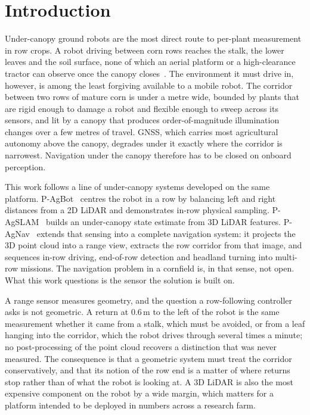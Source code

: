 \documentclass[conference]{IEEEtran}
\begin{document}
\section{Introduction}
Under-canopy ground robots are the most direct route to per-plant measurement in
row crops. A robot driving between corn rows reaches the stalk, the lower leaves
and the soil surface, none of which an aerial platform or a high-clearance
tractor can observe once the canopy closes~\cite{kim2022pagbot}. The environment
it must drive in, however, is among the least forgiving available to a mobile
robot. The corridor between two rows of mature corn is under a metre wide,
bounded by plants that are rigid enough to damage a robot and flexible enough to
sweep across its sensors, and lit by a canopy that produces order-of-magnitude
illumination changes over a few metres of travel. GNSS, which carries most
agricultural autonomy above the canopy, degrades under it exactly where the
corridor is narrowest. Navigation under the canopy therefore has to be closed on
onboard perception.

This work follows a line of under-canopy systems developed on the same platform.
P-AgBot~\cite{kim2022pagbot} centres the robot in a row by balancing left and
right distances from a 2D LiDAR and demonstrates in-row physical sampling.
P-AgSLAM~\cite{kim2024pagslam} builds an under-canopy state estimate from
3D LiDAR features. P-AgNav~\cite{kim2025pagnav} extends that sensing into a
complete navigation system: it projects the 3D point cloud into a range view,
extracts the row corridor from that image, and sequences in-row driving,
end-of-row detection and headland turning into multi-row missions. The
navigation problem in a cornfield is, in that sense, not open. What this work
questions is the sensor the solution is built on.

A range sensor measures geometry, and the question a row-following controller
asks is not geometric. A return at 0.6\,m to the left of the robot is the same
measurement whether it came from a stalk, which must be avoided, or from a leaf
hanging into the corridor, which the robot drives through several times a
minute; no post-processing of the point cloud recovers a distinction that was
never measured. The consequence is that a geometric system must treat the
corridor conservatively, and that its notion of the row end is a matter of
where returns stop rather than of what the robot is looking at. A 3D LiDAR is
also the most expensive component on the robot by a wide margin, which matters
for a platform intended to be deployed in numbers across a research farm.
\end{document}
